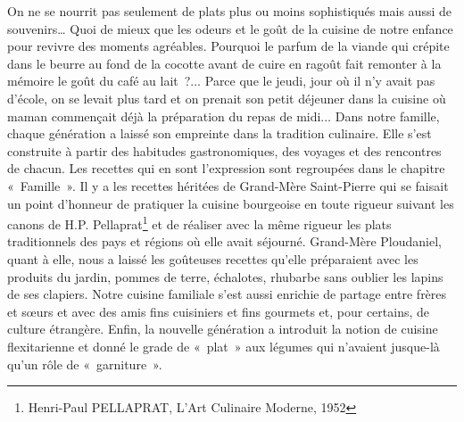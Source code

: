 On ne se nourrit pas seulement de plats plus ou moins sophistiqués mais aussi de souvenirs… Quoi de mieux que les odeurs et le goût de la cuisine de notre enfance pour revivre des moments agréables. Pourquoi le parfum de la viande qui crépite dans le beurre au fond de la cocotte avant de cuire en ragoût fait remonter à la mémoire le goût du café au lait ?$\ldots$ Parce que le jeudi, jour où il n’y avait pas d’école, on se levait plus tard et on prenait son petit déjeuner dans la cuisine où maman commençait déjà la préparation du repas de midi$\ldots$
Dans notre famille, chaque génération a laissé son empreinte dans la tradition culinaire. Elle s’est construite à partir des habitudes gastronomiques, des voyages et des rencontres de chacun. Les recettes qui en sont l’expression sont regroupées dans le chapitre « Famille ». Il y a les recettes héritées de Grand-Mère Saint-Pierre qui se faisait un point d’honneur de pratiquer la cuisine bourgeoise en toute rigueur suivant les canons de H.P. Pellaprat\footnote{Henri-Paul PELLAPRAT, L’Art Culinaire Moderne, 1952} et de réaliser avec la même rigueur les plats traditionnels des pays et régions où elle avait séjourné. Grand-Mère Ploudaniel, quant à elle, nous a laissé les goûteuses recettes qu’elle préparaient avec les produits du jardin, pommes de terre, échalotes, rhubarbe sans oublier les lapins de ses clapiers. Notre cuisine familiale s’est aussi enrichie de partage entre frères et sœurs et avec des amis fins cuisiniers et fins gourmets et, pour certains, de culture étrangère. Enfin, la nouvelle génération a introduit la notion de cuisine flexitarienne et donné le grade de « plat » aux légumes qui n’avaient jusque-là qu’un rôle de « garniture ». 
